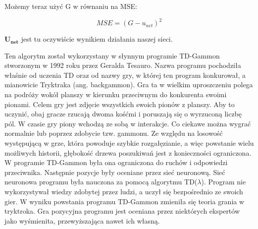 \noindent Możemy teraz użyć G w równaniu na MSE:

\begin{equation}
MSE = (G - u_{net})^2
\end{equation}

\noindent $\boldsymbol{U_{net}}$ jest tu oczywiście wynikiem działania naszej sieci.\newline

Ten algorytm został wykorzystany w słynnym programie TD-Gammon stworzonym w 1992 roku przez Geralda Tesauro. Nazwa programu pochodziła właśnie od uczenia TD oraz od nazwy gry, w której ten program konkurował, a mianowicie Tryktraka (ang. backgammon). Gra ta w wielkim uproszczeniu polega na podróży wokół planszy w kierunku przeciwnym do konkurenta swoimi pionami. Celem gry jest zdjęcie wszystkich swoich pionów z planszy. Aby to uczynić, obaj gracze rzucają dwoma kośćmi i poruszają się o wyrzuconą liczbę pól. W czasie gry piony wchodzą ze sobą w interakcje. Co ciekawe można wygrać normalnie lub poprzez zdobycie tzw. gammonu. Ze względu na losowość występującą w grze, która powoduje szybkie rozgałęzianie, a więc powstanie wielu możliwych historii, głębokość drzewa poszukiwań jest z konieczności ograniczona. W programie TD-Gammon była ona ograniczona do ruchów i odpowiedzi przeciwnika. Następnie pozycje były oceniane przez sieć neuronową. Sieć neuronowa programu była nauczona za pomocą algorytmu TD($\lambda$). Program nie wykorzystywał wiedzy zdobytej przez ludzi, a uczył się bezpośrednio ze swoich gier. W wyniku powstania programu TD-Gammon
zmieniła się teoria grania w tryktroka. Gra pozycyjna programu jest oceniana przez niektórych ekspertów jako wyśmienita, przewyższająca nawet ich własną.


